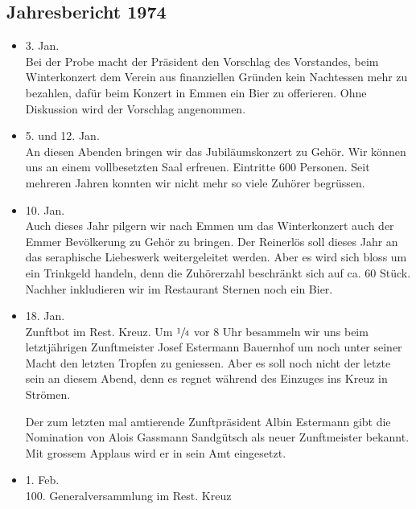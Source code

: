 \subsection{Jahresbericht 1974}

\begin{history}


    \begin{itemize}
        \item[]3. Jan.\\
        Bei der Probe macht der Präsident den Vorschlag des Vorstandes, beim
        Winterkonzert dem Verein aus finanziellen Gründen kein Nachtessen mehr
        zu bezahlen, dafür beim Konzert in Emmen ein Bier zu offerieren. Ohne
        Diskussion wird der Vorschlag angenommen.

        \item[]5. und 12. Jan.\\
        An diesen Abenden bringen wir das Jubiläumskonzert zu Gehör. Wir können
        uns an einem vollbesetzten Saal erfreuen. Eintritte 600 Personen. Seit
        mehreren Jahren konnten wir nicht mehr so viele Zuhörer begrüssen.

        \item[]10. Jan.\\
        Auch dieses Jahr pilgern wir nach Emmen um das Winterkonzert auch der
        Emmer Bevölkerung zu Gehör zu bringen. Der Reinerlös soll dieses Jahr an
        das seraphische Liebeswerk weitergeleitet werden. Aber es wird sich
        bloss um ein Trinkgeld handeln, denn die Zuhörerzahl beschränkt sich auf
        ca. 60 Stück. Nachher inkludieren wir im Restaurant Sternen noch ein
        Bier.

        \item[]18. Jan.\\
        Zunftbot im Rest. Kreuz. Um $\sfrac{1}{4}$ vor 8 Uhr besammeln wir uns
        beim letztjährigen Zunftmeister Josef Estermann Bauernhof um noch unter
        seiner Macht den letzten Tropfen zu geniessen. Aber es soll noch nicht
        der letzte sein an diesem Abend, denn es regnet während des Einzuges ins
        Kreuz in Strömen.

        Der zum letzten mal amtierende Zunftpräsident Albin Estermann gibt die
        Nomination von Alois Gassmann Sandgütsch als neuer Zunftmeister bekannt.
        Mit grossem Applaus wird er in sein Amt eingesetzt.

        \item[]1. Feb.\\
        100. Generalversammlung im Rest. Kreuz


\end{itemize}
\end{history}
